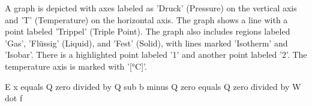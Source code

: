 A graph is depicted with axes labeled as 'Druck' (Pressure) on the vertical axis and 'T' (Temperature) on the horizontal axis. The graph shows a line with a point labeled 'Trippel' (Triple Point). The graph also includes regions labeled 'Gas', 'Flüssig' (Liquid), and 'Fest' (Solid), with lines marked 'Isotherm' and 'Isobar'. There is a highlighted point labeled '1' and another point labeled '2'. The temperature axis is marked with '[°C]'.

E x equals Q zero divided by Q sub b minus Q zero equals Q zero divided by W dot f